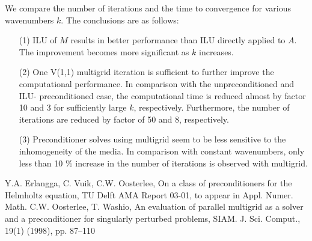 \documentclass{report}
\begin{document}
We compare the number of iterations and the time to convergence for
various wavenumbers $k$. The conclusions are as follows:
\begin{itemize}
\item[(1)] ILU of $M$ results in better performance than ILU directly
applied to $A$. The improvement becomes more significant as $k$
increases.
\item[(2)] One V(1,1) multigrid iteration is sufficient to further
improve the computational performance. In comparison with the
unpreconditioned and ILU- preconditioned case, the computational time is
reduced almost by factor 10 and 3 for sufficiently large $k$,
respectively. Furthermore, the number of iterations are reduced by factor
of 50 and 8, respectively.
\item[(3)] Preconditioner solves using multigrid seem to be less
sensitive to the inhomogeneity of the media. In comparison with constant
wavenumbers, only less than 10 \% increase in the number of iterations is
observed with multigrid.
\end{itemize}

\small
\begin{thebibliography}{8.}
Y.A. Erlangga, C. Vuik, C.W. Oosterlee, On a class of preconditioners for
the Helmholtz equation, TU Delft AMA Report 03-01, to appear in Appl.
Numer. Math.
C.W. Oosterlee, T. Washio, An evaluation of parallel multigrid as a
solver and a preconditioner for singularly perturbed problems, SIAM. J.
Sci. Comput., 19(1) (1998), pp. 87--110
\end{thebibliography}
\end{document}
